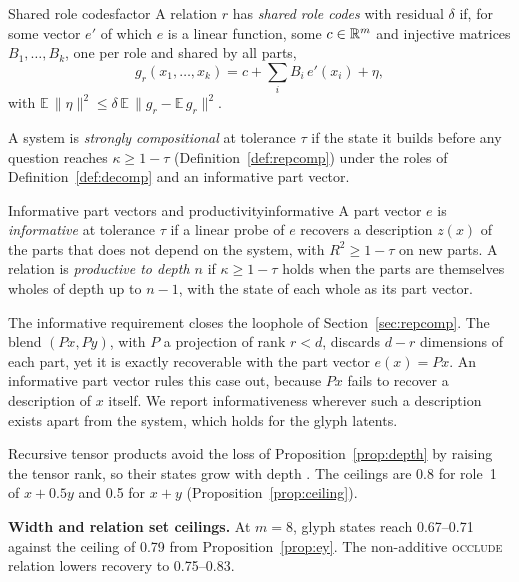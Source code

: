 
\begin{defbox}{Shared role codes}{factor}
A relation $r$ has \emph{shared role codes} with residual $\delta$ if, for some vector $e'$ of which $e$ is a linear function, some $c \in \mathbb{R}^m$ and injective matrices $B_1, \ldots, B_k$, one per role and shared by all parts,
\begin{equation}
  g_r(x_1, \ldots, x_k) = c + \textstyle\sum_{i} B_i\, e'(x_i) + \eta,
  \label{eq:factor}
\end{equation}
with $\mathbb{E}\,\lVert \eta \rVert^2 \le \delta\, \mathbb{E}\,\lVert g_r - \mathbb{E}\,g_r \rVert^2$.
\end{defbox}

A system is \emph{strongly compositional} at tolerance $\tau$ if the state it builds before any question reaches $\kappa \ge 1 - \tau$ (Definition~\ref{def:repcomp}) under the roles of Definition~\ref{def:decomp} and an informative part vector.

\begin{defbox}{Informative part vectors and productivity}{informative}
A part vector $e$ is \emph{informative} at tolerance $\tau$ if a linear probe of $e$ recovers a description $z(x)$ of the parts that does not depend on the system, with $R^2 \ge 1 - \tau$ on new parts. A relation is \emph{productive to depth $n$} if $\kappa \ge 1 - \tau$ holds when the parts are themselves wholes of depth up to $n - 1$, with the state of each whole as its part vector.
\end{defbox}

The informative requirement closes the loophole of Section~\ref{sec:repcomp}. The blend $(Px, Py)$, with $P$ a projection of rank $r < d$, discards $d - r$ dimensions of each part, yet it is exactly recoverable with the part vector $e(x) = Px$. An informative part vector rules this case out, because $Px$ fails to recover a description of $x$ itself. We report informativeness wherever such a description exists apart from the system, which holds for the glyph latents.

Recursive tensor products avoid the loss of Proposition~\ref{prop:depth} by raising the tensor rank, so their states grow with depth \citep{smolensky1990}. The ceilings are 0.8 for role~1 of $x + 0.5y$ and 0.5 for $x + y$ (Proposition~\ref{prop:ceiling}).


\textbf{Width and relation set ceilings.} At $m = 8$, glyph states reach 0.67--0.71 against the ceiling of 0.79 from Proposition~\ref{prop:ey}. The non-additive \textsc{occlude} relation lowers recovery to 0.75--0.83.

